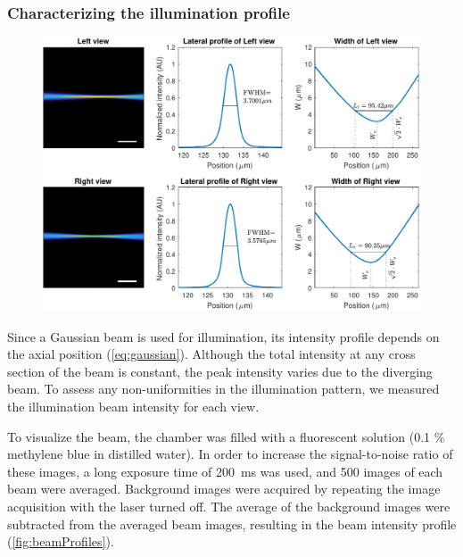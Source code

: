     

  \subsubsection{Characterizing the illumination profile}

    \begin{figure}[bthp]
      \centering
      \includegraphics[width=\textwidth]{beamPlots_view.pdf}
      \label{fig:beamProfiles}
    \end{figure}

    Since a Gaussian beam is used for illumination, its intensity profile depends on the axial position (\autoref{eq:gaussian}). Although the total intensity at any cross section of the beam is constant, the peak intensity varies due to the diverging beam. To assess any non-uniformities in the illumination pattern, we measured the illumination beam intensity for each view.

    To visualize the beam, the chamber was filled with a fluorescent solution (0.1 \% methylene blue in distilled water). In order to increase the signal-to-noise ratio of these images, a long exposure time of \SI{200}{ms} was used, and 500 images of each beam were averaged. Background images were acquired by repeating the image acquisition with the laser turned off. The average of the background images were subtracted from the averaged beam images, resulting in the beam intensity profile (\autoref{fig:beamProfiles}).

